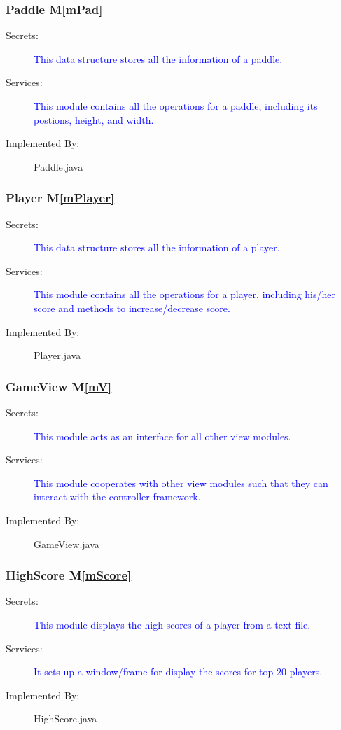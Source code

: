\documentclass[12pt,letterpaper]{article}
\begin{document}
	\subsubsection{Paddle M\ref{mPad}}
\begin{description} 
	\item[Secrets: ] \textcolor{blue}{This data structure stores all the information of a paddle.}
	\item[Services: ] \textcolor{blue} {This module contains all the operations for a paddle, including its postions, height, and width.}
	\item[Implemented By: ] Paddle.java
\end{description}


	\subsubsection{Player M\ref{mPlayer}}
\begin{description} 
	\item[Secrets: ] \textcolor{blue}{This data structure stores all the information of a player.}
	\item[Services: ] \textcolor{blue} {This module contains all the operations for a player, including his/her score and methods to increase/decrease score.}
	\item[Implemented By: ] Player.java
\end{description}

	\subsubsection{GameView M\ref{mV}}
\begin{description} 
	\item[Secrets: ] \textcolor{blue}{This module acts as an interface for all other view modules.}
	\item[Services: ] \textcolor{blue} {This module cooperates with other view modules such that they can interact with the controller framework.}
	\item[Implemented By: ] GameView.java
\end{description}	

	\subsubsection{HighScore M\ref{mScore}}
\begin{description} 
	\item[Secrets: ] \textcolor{blue}{This module displays the high scores of a player from a text file.}
	\item[Services: ] \textcolor{blue} {It sets up a window/frame for display the scores for top 20 players.}
	\item[Implemented By: ] HighScore.java
\end{description}
\end{document}
